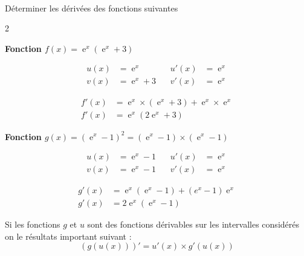 \documentclass[11pt,a4paper]{article}
\DeclareMathOperator{\e}{e}
\begin{document}
\vfill 


\newpage


\\[5 pt]
Déterminer les dérivées des fonctions suivantes

\begin{multicols}{2}
\begin{tcolorbox}[colback=red!5!white,colframe=red!75!black]
{
\textbf{ Fonction $f(x)=\e^x(\e^x+3)$}

\begin{align*}
u(x) & =\e^x  & ~~~~ u'(x) & =\e^x\\
v(x) & =\e^x +3  & ~~~~ v'(x) &  =\e^x
\end{align*}

\begin{align*}
f'(x) &= \e^x \times (\e^x+3) + \e^x \times \e^x \\
f'(x) &= \e^x(2\e^x + 3)
\end{align*}

}
\end{tcolorbox}

\columnbreak

\begin{tcolorbox}[colback=red!5!white,colframe=red!75!black]
{
\textbf{Fonction $g(x)=(\e^x-1)^2=(\e^x-1) \times (\e^x-1)$}

\begin{align*}
u(x) & =\e^x - 1  & ~~~~ u'(x) & =\e^x \\
v(x) & =\e^x - 1  & ~~~~ v'(x) &  =\e^x
\end{align*}

\begin{align*}
g'(x) &= \e^x(\e^x-1) + (e^x -1)\e^x \\
g'(x) &= 2\e^x(\e^x - 1)
\end{align*}

}
\end{tcolorbox}

\end{multicols}


\noindent
\begin{tcolorbox}[colback=red!5!white,colframe=red!75!black]
{
\vspace{1cm}
Si les fonctions $g$ et $u$ sont des fonctions dérivables sur les intervalles considérés on   le résultats important suivant : 
$$(g(u(x)))' = u'(x) \times g'(u(x))$$
\vspace{1cm}
}
\end{tcolorbox}
\noindent
\end{document}
